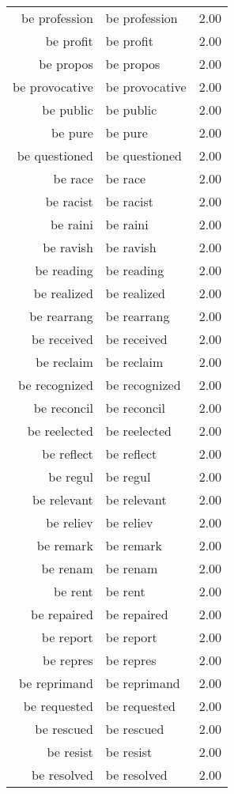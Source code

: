 \begin{table}[ht]
\begin{tabular}{rlr}
  be profession & be profession & 2.00 \\ 
  be profit & be profit & 2.00 \\ 
  be propos & be propos & 2.00 \\ 
  be provocative & be provocative & 2.00 \\ 
  be public & be public & 2.00 \\ 
  be pure & be pure & 2.00 \\ 
  be questioned & be questioned & 2.00 \\ 
  be race & be race & 2.00 \\ 
  be racist & be racist & 2.00 \\ 
  be raini & be raini & 2.00 \\ 
  be ravish & be ravish & 2.00 \\ 
  be reading & be reading & 2.00 \\ 
  be realized & be realized & 2.00 \\ 
  be rearrang & be rearrang & 2.00 \\ 
  be received & be received & 2.00 \\ 
  be reclaim & be reclaim & 2.00 \\ 
  be recognized & be recognized & 2.00 \\ 
  be reconcil & be reconcil & 2.00 \\ 
  be reelected & be reelected & 2.00 \\ 
  be reflect & be reflect & 2.00 \\ 
  be regul & be regul & 2.00 \\ 
  be relevant & be relevant & 2.00 \\ 
  be reliev & be reliev & 2.00 \\ 
  be remark & be remark & 2.00 \\ 
  be renam & be renam & 2.00 \\ 
  be rent & be rent & 2.00 \\ 
  be repaired & be repaired & 2.00 \\ 
  be report & be report & 2.00 \\ 
  be repres & be repres & 2.00 \\ 
  be reprimand & be reprimand & 2.00 \\ 
  be requested & be requested & 2.00 \\ 
  be rescued & be rescued & 2.00 \\ 
  be resist & be resist & 2.00 \\ 
  be resolved & be resolved & 2.00 \\ 

\end{tabular}
\end{table}
